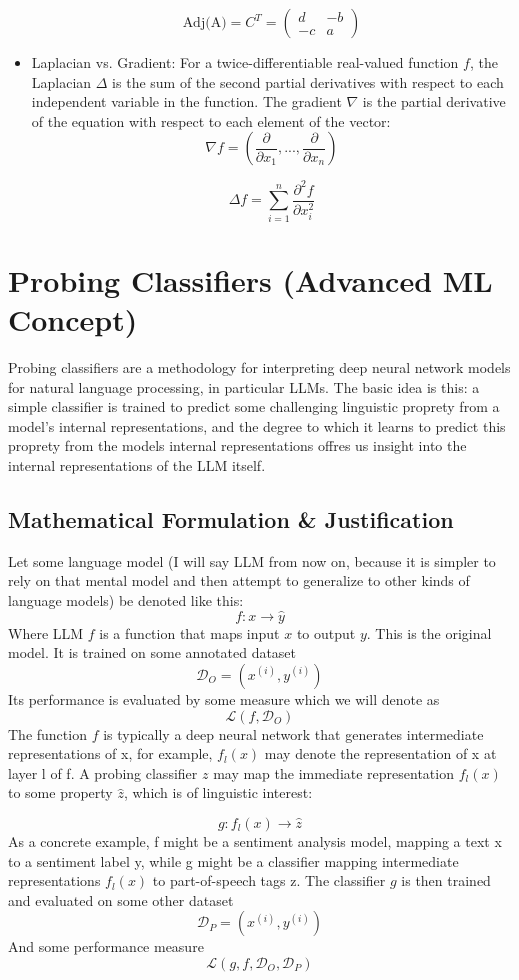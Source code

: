 \documentclass[12pt]{article}
\begin{document}
\begin{itemize}
\[ \text{Adj(A)} = C^T =
\begin{pmatrix}
d & -b \\
-c & a
\end{pmatrix}
\]

\item{Laplacian vs. Gradient}: For a twice-differentiable real-valued function \(f\), the Laplacian \(\Delta\) is the sum of the second partial derivatives with respect to each independent variable in the function. The gradient \(\nabla\) is the partial derivative of the equation with respect to each element of the vector: 
\[\nabla f = \left(\frac{\partial}{\partial x_1}, ... , \frac{\partial}{\partial x_n}\right)\]

\[\Delta f = \sum_{i=1}^n\frac{\partial^2f}{\partial x_i^2}\]
\end{itemize}
\section{Probing Classifiers (Advanced ML Concept)}
Probing classifiers are a methodology for interpreting deep neural network models for natural language processing, in particular LLMs. The basic idea is this: a simple classifier is trained to predict some challenging linguistic proprety from a model's internal representations, and the degree to which it learns to predict this proprety from the models internal representations offres us insight into the internal representations of the LLM itself. 
\subsection{Mathematical Formulation \& Justification}
Let some language model (I will say LLM from now on, because it is simpler to rely on that mental model and then attempt to generalize to other kinds of language models) be denoted like this:
\[f: x \rightarrow \hat{y}\]
Where LLM \(f\) is a function that maps input \(x\) to output \(y\). This is the original model. It is trained on some annotated dataset
\[\mathcal{D}_O = (x^{(i)}, y^{(i)})\]
Its performance is evaluated by some measure which we will denote as 
\[\mathcal{L}(f,\mathcal{D}_O )\]
The function \(f\) is typically a deep neural network that generates intermediate representations of x, for example, \( f_l(x) \) may denote the representation of x at layer l of f. A probing classifier \(z\) may map the immediate representation  \( f_l(x) \) to some property \(\hat{z}\), which is of linguistic interest:

\[g:f_l(x)\rightarrow \hat{z}\]
As a concrete example, f might be a sentiment analysis model, mapping a text x to a sentiment label y, while g might be a classifier mapping intermediate representations \( f_l(x) \) to part-of-speech tags z. The classifier \(g\) is then trained and evaluated on some other dataset
\[\mathcal{D}_P = (x^{(i)}, y^{(i)})\]
And some performance measure
\[\mathcal{L}(g,f,\mathcal{D}_O,\mathcal{D}_P )\]
\end{document}
